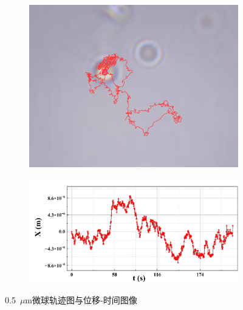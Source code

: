\documentclass[a4paper]{report} %
\begin{document}
\begin{figure}[H]
    \begin{subfigure}{0.3\textwidth}
        \includegraphics[width=\linewidth]{image5.png}
    \end{subfigure}
    \begin{subfigure}{0.6\textwidth}
        \includegraphics[width=\linewidth]{image6.png}
    \end{subfigure}

    \caption{0.5~$\mu$m微球轨迹图与位移-时间图像}
\end{figure}
\newpage
\end{document}
